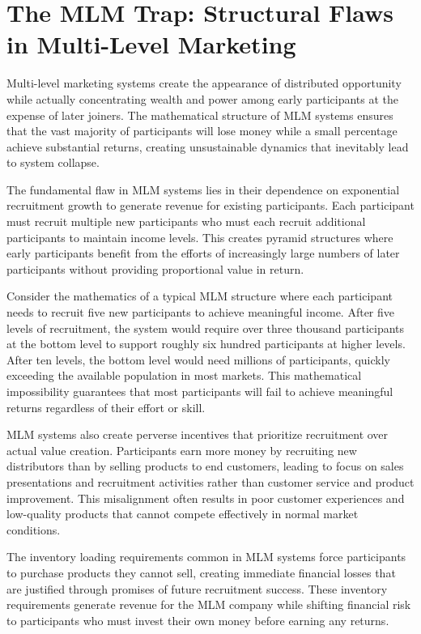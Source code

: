 \documentclass[
  Letterpaper,
]{scrbook}
\begin{document}
\section{The MLM Trap: Structural Flaws in Multi-Level
Marketing}\label{the-mlm-trap-structural-flaws-in-multi-level-marketing}

Multi-level marketing systems create the appearance of distributed
opportunity while actually concentrating wealth and power among early
participants at the expense of later joiners. The mathematical structure
of MLM systems ensures that the vast majority of participants will lose
money while a small percentage achieve substantial returns, creating
unsustainable dynamics that inevitably lead to system collapse.

The fundamental flaw in MLM systems lies in their dependence on
exponential recruitment growth to generate revenue for existing
participants. Each participant must recruit multiple new participants
who must each recruit additional participants to maintain income levels.
This creates pyramid structures where early participants benefit from
the efforts of increasingly large numbers of later participants without
providing proportional value in return.

Consider the mathematics of a typical MLM structure where each
participant needs to recruit five new participants to achieve meaningful
income. After five levels of recruitment, the system would require over
three thousand participants at the bottom level to support roughly six
hundred participants at higher levels. After ten levels, the bottom
level would need millions of participants, quickly exceeding the
available population in most markets. This mathematical impossibility
guarantees that most participants will fail to achieve meaningful
returns regardless of their effort or skill.

MLM systems also create perverse incentives that prioritize recruitment
over actual value creation. Participants earn more money by recruiting
new distributors than by selling products to end customers, leading to
focus on sales presentations and recruitment activities rather than
customer service and product improvement. This misalignment often
results in poor customer experiences and low-quality products that
cannot compete effectively in normal market conditions.

The inventory loading requirements common in MLM systems force
participants to purchase products they cannot sell, creating immediate
financial losses that are justified through promises of future
recruitment success. These inventory requirements generate revenue for
the MLM company while shifting financial risk to participants who must
invest their own money before earning any returns.
\end{document}
